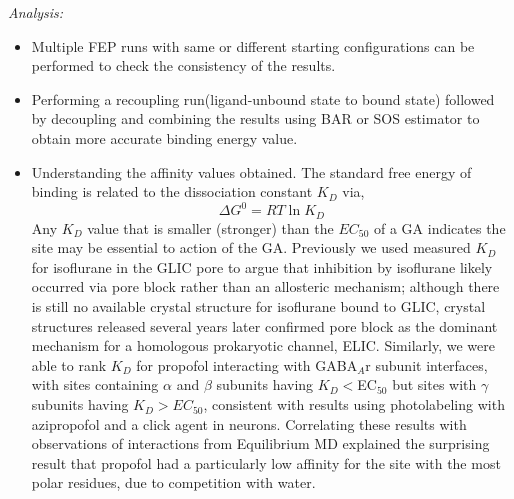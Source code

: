 \documentclass[12pt]{article}
\begin{document}
\textit{Analysis:}
	\begin{itemize}
		\item Multiple FEP runs with same or different starting configurations can be performed to check the consistency of the results.
	\item Performing a recoupling run(ligand-unbound state to bound state) followed by decoupling and combining the results using  BAR or SOS estimator to obtain more accurate binding energy value.
	\item Understanding the affinity values obtained. The standard free energy of binding is related to the dissociation constant $K_{D}$ via,
	\begin{equation}
	  \Delta G^{0}=RT  \ln K_{D}
	\end{equation}
	Any $K_{D}$ value that is smaller (stronger) than the $EC_{50}$ of a GA indicates the site may be essential to action of the GA.  %
	Previously we used measured $K_{D}$ for isoflurane in the GLIC pore to argue that inhibition by isoflurane likely occurred via pore block rather than an allosteric mechanism;\cite{LeBard2012a} although there is still no available crystal structure for isoflurane bound to GLIC, crystal structures released several years later confirmed pore block as the dominant mechanism for a homologous prokaryotic channel, ELIC\cite{Chen2015}. Similarly, we were able to rank $K_{D}$ for propofol interacting with GABA$_{A}$r subunit interfaces, with sites containing $\alpha$ and $\beta$ subunits having $K_{D} <$EC$_{50}$ but sites with $\gamma$ subunits having $K_{D} >  EC_{50}$, consistent with results using photolabeling with azipropofol and a click agent in neurons. Correlating these results with observations of interactions from Equilibrium MD explained the surprising result that propofol had a particularly low affinity for the site with the most polar residues, due to competition with water.\cite{Woll2016a}   %
	\end{itemize}
\end{document}
